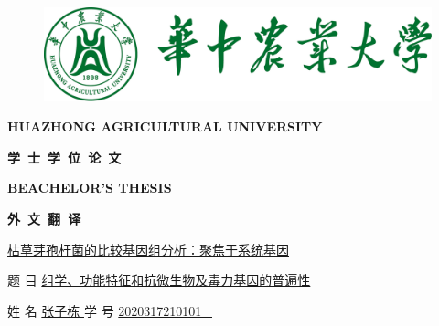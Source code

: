 \documentclass[UTF8]{ctexart}
\begin{document}
\thispagestyle{empty}

\begin{figure}[!t]
    \centering
    \includegraphics[scale=0.7]{figures/hzua_logo.png}
\end{figure}
\begin{center}
    {\noindent{}\textbf{HUAZHONG AGRICULTURAL UNIVERSITY}} 

    \vspace{1.5cm}

    {\fontsize{38}{3}\heiti\textbf{学\ 士\ 学\ 位\ 论\ 文}}

    \vspace{0.4cm}

    {\textbf{BEACHELOR'S THESIS}}

    \vspace{2cm}

    {\fontsize{45}{3mm}\heiti\textbf{外\ 文\ 翻\ 译}}
    
    \vspace{2cm}

\end{center}

{ \heiti \fontsize{16}{16} \noindent \hspace{2.8cm}
\underline{枯草芽孢杆菌的比较基因组分析：聚焦于系统基因}
}

\vspace{-3mm}

{ \heiti \fontsize{18}{18} \noindent 题 \hspace{1cm} 目  
\fontsize{16}{16}\hspace{3.8mm}\underline{组学、功能特征和抗微生物及毒力基因的普遍性\hspace{6.2mm}}
}

\vspace{8mm}

{ \heiti \fontsize{18}{18} \noindent 
姓 \hspace{1cm} 名  \quad \underline{\hspace{1.2cm} 张子栋 \hspace{1.2cm}} \quad  学 \hspace{1cm} 号 \quad\underline{\quad {} 2020317210101 \ }
}
\end{document}
